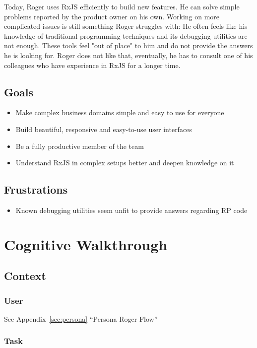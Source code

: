 \documentclass[sigplan,screen,nonacm,review]{acmart}
\begin{document}
Today, Roger uses RxJS efficiently to build new features. He can solve simple problems reported by the product owner on his own. Working on more complicated issues is still something Roger struggles with: He often feels like his knowledge of traditional programming techniques and its debugging utilities are not enough. These tools feel "out of place" to him and do not provide the answers he is looking for. Roger does not like that, eventually, he has to consult one of his colleagues who have experience in RxJS for a longer time.

\subsection{Goals}
\begin{itemize}
	\item Make complex business domains simple and easy to use for everyone
	\item Build beautiful, responsive and easy-to-use user interfaces
	\item Be a fully productive member of the team
	\item Understand RxJS in complex setups better and deepen knowledge on it
\end{itemize}

\subsection{Frustrations}
\begin{itemize}
	\item Known debugging utilities seem unfit to provide answers regarding RP code
\end{itemize}


\section{Cognitive Walkthrough}
\label{sec:cogitive-walkthrough-appendix}

\subsection{Context}

\subsubsection{User}
See Appendix~\ref{sec:persona} ``Persona Roger Flow''

\subsubsection{Task}
\end{document}
